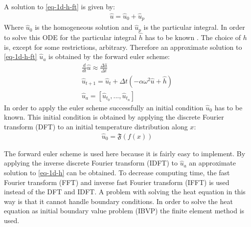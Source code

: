 A solution to \ref{eq-1d-h-ft} is given by:
\begin{gather}
\hat{u} = \hat{u}_{0} + \hat{u}_{p}
\end{gather}
Where \(\hat{u}_{0}\) is the homogeneous solution and \(\hat{u}_{p}\) is the particular integral.
In order to solve this ODE for the particular integral \(\hat{h}\) has to be known \cite{Papula2015}.
The choice of \(h\) is, except for some restrictions, arbitrary.
Therefore an approximate solution to \ref{eq-1d-h-ft} \(\hat{u}_{a}\) is obtained by the forward euler scheme:
\begin{gather}
\frac{d}{dt} \hat{u} \approx \frac{\Delta \hat{u}}{\Delta t} \\
\hat{u}_{t+1} = \hat{u}_{t} + \Delta t (-\alpha\omega^{2}\hat{u} + \hat{h}) \label{eq-1d-h-es} \\
\hat{u}_{a} = [\hat{u}_{t_{0}}, ..., \hat{u}_{t_{n}}]
\end{gather}
In order to apply the euler scheme successfully an initial condition   \(\hat{u}_{0}\) has to be known. 
This initial condition is obtained by applying the discrete Fourier transform (DFT) to an initial temperature distribution along \(x\):
\begin{gather}
\hat{u}_{0} = \mathfrak{F}(f(x)) 
\end{gather} 
\cite{Gustafsson2011b}

The forward euler scheme is used here because it is fairly easy to implement.
By applying the  inverse discrete Fourier transform (IDFT) to \(\hat{u}_{a}\) an approximate solution to \ref{eq-1d-h} can be obtained.
To decrease computing time, the fast Fourier transform (FFT) and inverse fast Fourier transform (IFFT) is used instead of the DFT and IDFT.
A problem with solving the heat equation in this way is that it cannot handle boundary conditions.
In order to solve the heat equation as initial boundary value problem (IBVP) the finite element method is used.